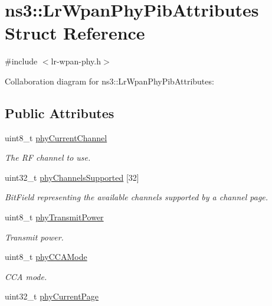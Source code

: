 \hypertarget{structns3_1_1LrWpanPhyPibAttributes}{}\section{ns3\+:\+:Lr\+Wpan\+Phy\+Pib\+Attributes Struct Reference}
\label{structns3_1_1LrWpanPhyPibAttributes}


{\ttfamily \#include $<$lr-\/wpan-\/phy.\+h$>$}



Collaboration diagram for ns3\+:\+:Lr\+Wpan\+Phy\+Pib\+Attributes\+:
\subsection*{Public Attributes}
\begin{DoxyCompactItemize}
\item 
uint8\+\_\+t \hyperlink{structns3_1_1LrWpanPhyPibAttributes_a8e620dfd0f5b45fa6c9525d93c498fcb}{phy\+Current\+Channel}
\begin{DoxyCompactList}\small\item\em The RF channel to use. \end{DoxyCompactList}\item 
uint32\+\_\+t \hyperlink{structns3_1_1LrWpanPhyPibAttributes_a1bdcf71ffdbe0812d44d95ae2a5ae633}{phy\+Channels\+Supported} \mbox{[}32\mbox{]}
\begin{DoxyCompactList}\small\item\em Bit\+Field representing the available channels supported by a channel page. \end{DoxyCompactList}\item 
uint8\+\_\+t \hyperlink{structns3_1_1LrWpanPhyPibAttributes_a3fa4a8802211d54c7b4065fe3f086640}{phy\+Transmit\+Power}
\begin{DoxyCompactList}\small\item\em Transmit power. \end{DoxyCompactList}\item 
uint8\+\_\+t \hyperlink{structns3_1_1LrWpanPhyPibAttributes_a41d736be38b2dd87bb9fa2b2090723e8}{phy\+C\+C\+A\+Mode}
\begin{DoxyCompactList}\small\item\em C\+CA mode. \end{DoxyCompactList}\item 
uint32\+\_\+t \hyperlink{structns3_1_1LrWpanPhyPibAttributes_aab22c5f1b6b07b53e6daedd0d2cc0332}{phy\+Current\+Page}

\end{DoxyCompactItemize}
